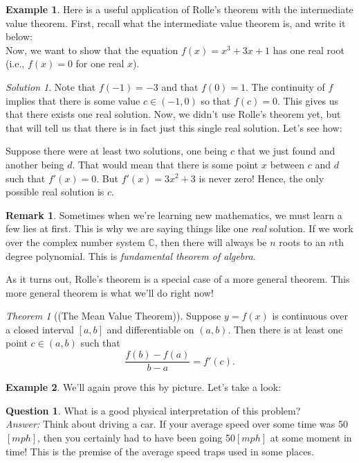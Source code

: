 \documentclass[leqno]{article}
\theoremstyle{definition}
\newtheorem{remark}{Remark}[section]
\newtheorem{example}{Example}[section]
\newtheorem{question}{Question}[section]
\theoremstyle{remark}
\newtheorem*{solution}{Solution}
\theoremstyle{theorem}
\newtheorem{theorem}{Theorem}[section]
\begin{document}
\begin{example}
Here is a useful application of Rolle's theorem with the intermediate value theorem. First, recall what the intermediate value theorem is, and write it below:
\vspace*{3cm}\\
Now, we want to show that the equation $f(x)=x^3+3x+1$ has one real root (i.e., $f(x)=0$ for one real $x$). 
\begin{solution}
Note that $f(-1)=-3$ and that $f(0)=1$. The continuity of $f$ implies that there is some value $c\in (-1,0)$ so that $f(c)=0$.  This gives us that there exists one real solution.  Now, we didn't use Rolle's theorem yet, but that will tell us that there is in fact just this single real solution. Let's see how:

Suppose there were at least two solutions, one being $c$ that we just found and another being $d$. That would mean that there is some point $x$ between $c$ and $d$ such that $f'(x)=0$.  But $f'(x)=3x^2+3$ is never zero! Hence, the only possible real solution is $c$.
\end{solution}
\end{example}


\begin{remark}
Sometimes when we're learning new mathematics, we must learn a few lies at first.  This is why we are saying things like one \emph{real} solution. If we work over the complex number system $\mathbb{C}$, then there will always be $n$ roots to an $n$th degree polynomial.  This is \emph{fundamental theorem of algebra}.
\end{remark}

As it turns out, Rolle's theorem is a special case of a more general theorem.  This more general theorem is what we'll do right now!

\begin{theorem}[(The Mean Value Theorem)]
Suppose $y=f(x)$ is continuous over a closed interval $[a,b]$ and differentiable on $(a,b)$. Then there is at least one point $c\in (a,b)$ such that
\[
\frac{f(b)-f(a)}{b-a}=f'(c).
\]
\end{theorem}

\begin{example}
We'll again prove this by picture.  Let's take a look:
\vspace*{6cm}\\
\end{example}

\begin{question}
What is a good physical interpretation of this problem?\\

\noindent \emph{Answer:} Think about driving a car.  If your average speed over some time was 50$[mph]$, then you certainly had to have been going 50$[mph]$ at some moment in time! This is the premise of the average speed traps used in some places.
\end{question}
\end{document}
